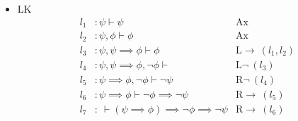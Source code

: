 \begin{itemize}
\begin{itemize}
\begin{align*}
                   l_{11}: &\vdash l_{10} \implies (\psi \implies \phi) \implies l_{10} &\text{(K)} \\
                   l_{12}: &\vdash  (\psi \implies \phi) \implies (\neg \phi \implies \psi \implies \phi) \implies (\neg \phi \implies \neg \psi) &\text{(MP$(l_{11}, l_{10})$)} \\
                   l_{13}: &\vdash l_{12} \implies l_1 \implies (\psi \implies \phi) \implies (\neg \phi \implies \neg \psi) &\text{(S)}  \\
                   l_{14}: &\vdash l_1 \implies (\psi \implies \phi) \implies (\neg \phi \implies \neg \psi) &\text{(MP$(l_{13}, l_{12})$)} \\
                   l_{15}: &\vdash (\psi \implies \phi) \implies (\neg \phi \implies \neg \psi) &\text{(MP$(l_{14}, l_{1})$)} \\
            \end{align*} 

        \item[(b)] LK
        \begin{align*}
            l_1&: \psi \vdash \psi &\text{Ax} \\
            l_2&: \psi, \phi \vdash \phi &\text{Ax} \\
            l_3&: \psi, \psi \implies \phi \vdash \phi &\text{L$\rightarrow \ (l_1, l_2)$} \\
            l_4&: \psi, \psi \implies \phi, \neg \phi \vdash &\text{L$\neg \ (l_3)$} \\
            l_5&: \psi \implies \phi, \neg \phi \vdash \neg \psi &\text{R$\neg \ (l_4)$ } \\
            l_6&: \psi \implies \phi \vdash \neg \phi \implies \neg \psi &\text{R$\rightarrow \ (l_5)$ } \\
            l_7&: \ \vdash (\psi \implies \phi) \implies \neg \phi \implies \neg \psi &\text{R$\rightarrow \ (l_6)$ } \\
        \end{align*}
    \end{itemize}


\end{itemize}
